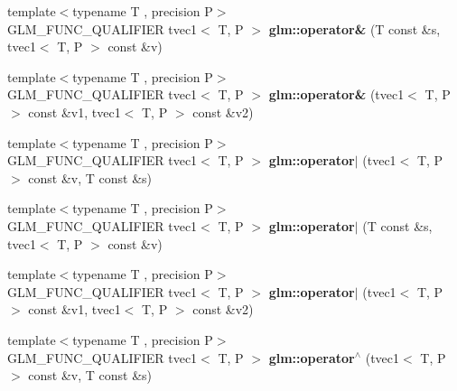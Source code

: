 \begin{DoxyCompactItemize}
\item 
\hypertarget{namespaceglm_a1c38ed6f0231f681ebe22c6e4fc3f8d6}{{\footnotesize template$<$typename T , precision P$>$ }\\G\-L\-M\-\_\-\-F\-U\-N\-C\-\_\-\-Q\-U\-A\-L\-I\-F\-I\-E\-R tvec1$<$ T, P $>$ {\bfseries glm\-::operator\&} (T const \&s, tvec1$<$ T, P $>$ const \&v)}\label{namespaceglm_a1c38ed6f0231f681ebe22c6e4fc3f8d6}

\item 
\hypertarget{namespaceglm_a15a52cecc7869d6d1c4022296c818345}{{\footnotesize template$<$typename T , precision P$>$ }\\G\-L\-M\-\_\-\-F\-U\-N\-C\-\_\-\-Q\-U\-A\-L\-I\-F\-I\-E\-R tvec1$<$ T, P $>$ {\bfseries glm\-::operator\&} (tvec1$<$ T, P $>$ const \&v1, tvec1$<$ T, P $>$ const \&v2)}\label{namespaceglm_a15a52cecc7869d6d1c4022296c818345}

\item 
\hypertarget{namespaceglm_a2a3524ef66a6c9344a72369c8f178a94}{{\footnotesize template$<$typename T , precision P$>$ }\\G\-L\-M\-\_\-\-F\-U\-N\-C\-\_\-\-Q\-U\-A\-L\-I\-F\-I\-E\-R tvec1$<$ T, P $>$ {\bfseries glm\-::operator$\vert$} (tvec1$<$ T, P $>$ const \&v, T const \&s)}\label{namespaceglm_a2a3524ef66a6c9344a72369c8f178a94}

\item 
\hypertarget{namespaceglm_a7a286492d45d6ebbd5b452305dde4874}{{\footnotesize template$<$typename T , precision P$>$ }\\G\-L\-M\-\_\-\-F\-U\-N\-C\-\_\-\-Q\-U\-A\-L\-I\-F\-I\-E\-R tvec1$<$ T, P $>$ {\bfseries glm\-::operator$\vert$} (T const \&s, tvec1$<$ T, P $>$ const \&v)}\label{namespaceglm_a7a286492d45d6ebbd5b452305dde4874}

\item 
\hypertarget{namespaceglm_a4f13423d9e8ce29a4ff6569e689e442f}{{\footnotesize template$<$typename T , precision P$>$ }\\G\-L\-M\-\_\-\-F\-U\-N\-C\-\_\-\-Q\-U\-A\-L\-I\-F\-I\-E\-R tvec1$<$ T, P $>$ {\bfseries glm\-::operator$\vert$} (tvec1$<$ T, P $>$ const \&v1, tvec1$<$ T, P $>$ const \&v2)}\label{namespaceglm_a4f13423d9e8ce29a4ff6569e689e442f}

\item 
\hypertarget{namespaceglm_a14fc8481b3728d3af4f70e2a4128f7a9}{{\footnotesize template$<$typename T , precision P$>$ }\\G\-L\-M\-\_\-\-F\-U\-N\-C\-\_\-\-Q\-U\-A\-L\-I\-F\-I\-E\-R tvec1$<$ T, P $>$ {\bfseries glm\-::operator$^\wedge$} (tvec1$<$ T, P $>$ const \&v, T const \&s)}\label{namespaceglm_a14fc8481b3728d3af4f70e2a4128f7a9}


\end{DoxyCompactItemize}
